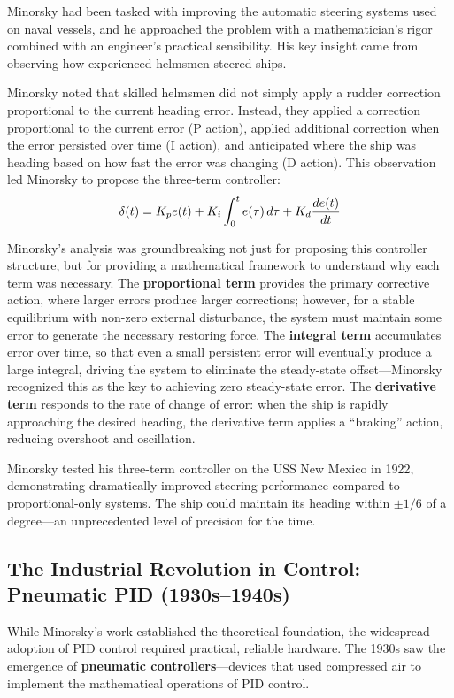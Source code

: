 Minorsky had been tasked with improving the automatic steering systems used on naval vessels, and he approached the problem with a mathematician's rigor combined with an engineer's practical sensibility. His key insight came from observing how experienced helmsmen steered ships.

Minorsky noted that skilled helmsmen did not simply apply a rudder correction proportional to the current heading error. Instead, they applied a correction proportional to the current error (P action), applied additional correction when the error persisted over time (I action), and anticipated where the ship was heading based on how fast the error was changing (D action). This observation led Minorsky to propose the three-term controller:
\begin{equation}
\delta(t) = K_p e(t) + K_i \int_0^t e(\tau) \, d\tau + K_d \frac{de(t)}{dt}
\label{eq:minorsky_pid}
\end{equation}

Minorsky's analysis was groundbreaking not just for proposing this controller structure, but for providing a mathematical framework to understand why each term was necessary. The \textbf{proportional term} provides the primary corrective action, where larger errors produce larger corrections; however, for a stable equilibrium with non-zero external disturbance, the system must maintain some error to generate the necessary restoring force. The \textbf{integral term} accumulates error over time, so that even a small persistent error will eventually produce a large integral, driving the system to eliminate the steady-state offset---Minorsky recognized this as the key to achieving zero steady-state error. The \textbf{derivative term} responds to the rate of change of error: when the ship is rapidly approaching the desired heading, the derivative term applies a ``braking'' action, reducing overshoot and oscillation.

Minorsky tested his three-term controller on the USS New Mexico in 1922, demonstrating dramatically improved steering performance compared to proportional-only systems. The ship could maintain its heading within $\pm 1/6$ of a degree---an unprecedented level of precision for the time.

\subsection{The Industrial Revolution in Control: Pneumatic PID (1930s--1940s)}

While Minorsky's work established the theoretical foundation, the widespread adoption of PID control required practical, reliable hardware. The 1930s saw the emergence of \textbf{pneumatic controllers}---devices that used compressed air to implement the mathematical operations of PID control.

